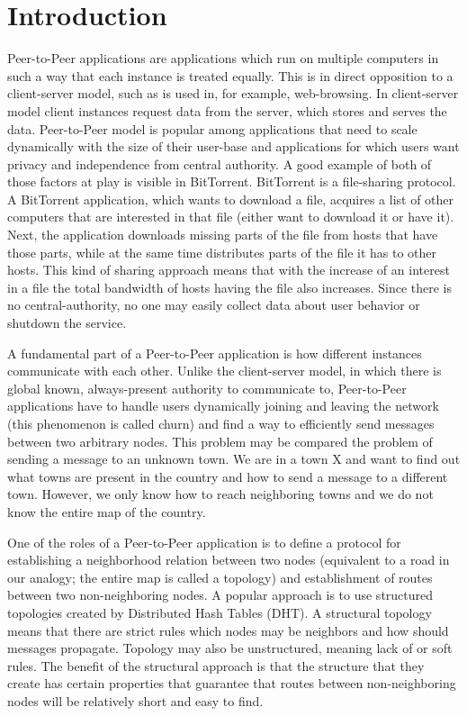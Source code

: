 \chapter{Introduction}

Peer-to-Peer applications are applications which run on multiple computers in
such a way that each instance is treated equally.
This is in direct opposition to a client-server model, such as is used in, for
example, web-browsing.
In client-server model client instances request data from the server, which
stores and serves the data.
Peer-to-Peer model is popular among applications that need to scale dynamically
with the size of their user-base and applications for which users want privacy
and independence from central authority.
A good example of both of those factors at play is visible in BitTorrent.
BitTorrent is a file-sharing protocol.
A BitTorrent application, which wants to download a file, acquires a list of
other computers that are interested in that file (either want to download it or
have it).
Next, the application downloads missing parts of the file from hosts that have
those parts, while at the same time distributes parts of the file it has to
other hosts.
This kind of sharing approach means that with the increase of an interest in a
file the total bandwidth of hosts having the file also increases.
Since there is no central-authority, no one may easily collect data about user
behavior or shutdown the service.

A fundamental part of a Peer-to-Peer application is how different instances
communicate with each other.
Unlike the client-server model, in which there is global known, always-present
authority to communicate to, Peer-to-Peer applications have to handle users
dynamically joining and leaving the network (this phenomenon is called churn)
and find a way to efficiently send messages between two arbitrary nodes.
This problem may be compared the problem of sending a message to an unknown
town.
We are in a town X and want to find out what towns are present in the country
and how to send a message to a different town.
However, we only know how to reach neighboring towns and we do not know the
entire map of the country.

One of the roles of a Peer-to-Peer application is to define a protocol for
establishing a neighborhood relation between two nodes (equivalent to a road in
our analogy; the entire map is called a topology) and establishment of routes
between two non-neighboring nodes.
A popular approach is to use structured topologies created by Distributed Hash
Tables (DHT).
A structural topology means that there are strict rules which nodes may be
neighbors and how should messages propagate.
Topology may also be unstructured, meaning lack of or soft rules.
The benefit of the structural approach is that the structure that they create
has certain properties that guarantee that routes between non-neighboring nodes
will be relatively short and easy to find.

